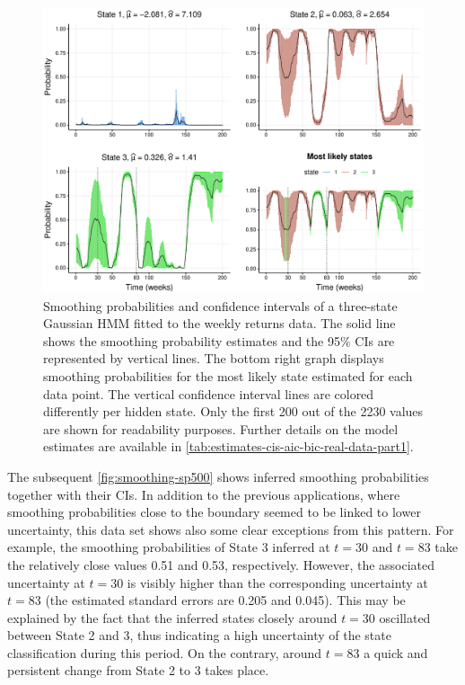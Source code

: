 \documentclass[]{interact}\usepackage[]{graphicx}\usepackage[dvipsnames]{xcolor}
\makeatletter
\def\maxwidth{ %
  \ifdim\Gin@nat@width>\linewidth
    \linewidth
  \else
    \Gin@nat@width
  \fi
}
\newenvironment{knitrout}{}{} %
\theoremstyle{plain}%
\theoremstyle{definition}
\theoremstyle{remark}
\makeatother
\begin{document}
\begin{knitrout}
\color{fgcolor}\begin{figure}[!htb]

{\centering \includegraphics[width=\maxwidth]{figure/smoothing-sp500-1} 

}

\caption{Smoothing probabilities and confidence intervals of a three-state Gaussian HMM fitted to the weekly returns data. The solid line shows the smoothing probability estimates and the 95\% CIs are represented by vertical lines. The bottom right graph displays smoothing probabilities for the most likely state estimated for each data point. The vertical confidence interval lines are colored differently per hidden state. Only the first 200 out of the 2230 values are shown for readability purposes. Further details on the model estimates are available in \autoref{tab:estimates-cis-aic-bic-real-data-part1}.}\label{fig:smoothing-sp500}
\end{figure}

\end{knitrout}

The subsequent \autoref{fig:smoothing-sp500} shows inferred smoothing probabilities together with their CIs. In addition to the previous applications, where smoothing probabilities close to the boundary seemed to be linked to lower uncertainty, this data set shows also some clear exceptions from this pattern. For example, the smoothing probabilities of State 3 inferred at $t = 30$ and $t = 83$ take the relatively close values 0.51 and 0.53, respectively. However, the associated uncertainty at $t = 30$ is visibly higher than the corresponding uncertainty at $t = 83$ (the estimated standard errors are 0.205 and 0.045). This may be explained by the fact that the inferred states closely around $t=30$ oscillated between State 2 and 3, thus indicating a high uncertainty of the state classification during this period. On the contrary, around $t=83$ a quick and persistent change from State 2 to 3 takes place.
\end{document}
